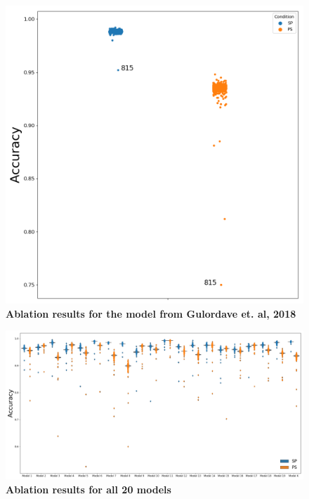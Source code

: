 \documentclass[a4paper, 11pt]{article}
\newcommand{\beginsupplement}{%
        \setcounter{table}{0}
        \renewcommand{\thetable}{S\arabic{table}}%
        \setcounter{figure}{0}
        \renewcommand{\thefigure}{S\arabic{figure}}%
     }
\begin{document}
\beginsupplement

\begin{figure}
    \centering
    \includegraphics[width=\linewidth]{figures/SM/Ablation_results_K_model.png}
    \caption{\textbf{Ablation results for the model from Gulordave et. al, 2018}}
    \label{fig:ablation_K_model}
\end{figure}

\begin{landscape}
\begin{figure}
    \centering
    \includegraphics[width=\linewidth]{figures/SM/Ablation_results_all_models.png}
    \caption{\textbf{Ablation results for all 20 models}}
    \label{fig:ablation_all_models}
\end{figure}
\end{landscape}
\end{document}

